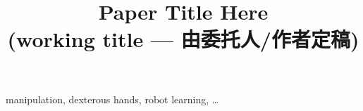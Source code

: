 \documentclass[journal]{IEEEtran}
\begin{document}
\title{Paper Title Here\\ \vspace{2pt}
\large (working title — 由委托人/作者定稿)}
\author{%
}
\maketitle

\begin{abstract}

\end{abstract}

\begin{IEEEkeywords}
manipulation, dexterous hands, robot learning, \ldots %
\end{IEEEkeywords}







\appendix




\end{document}

